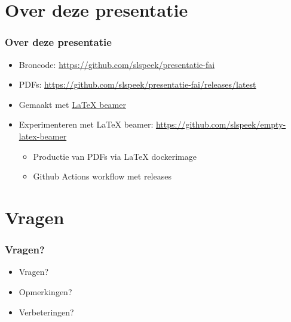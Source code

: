 \documentclass{beamer}
\begin{document}
\section{Over deze presentatie}

\begin{frame}
\frametitle{Over deze presentatie}
\begin{itemize}
  \item Broncode: \url{https://github.com/slspeek/presentatie-fai}
  \item PDFs: \url{https://github.com/slspeek/presentatie-fai/releases/latest}
  \item Gemaakt met \href{https://nl.mirrors.cicku.me/ctan/macros/latex/contrib/beamer/doc/beameruserguide.pdf}{\LaTeX{} beamer}
  \item Experimenteren met \LaTeX{} beamer: \url{https://github.com/slspeek/empty-latex-beamer}
  \begin{itemize}
    \item Productie van PDFs via \LaTeX{} dockerimage
    \item Github Actions workflow met releases
  \end{itemize}
\end{itemize}

\end{frame}

\section{Vragen}
\begin{frame}
\frametitle{Vragen?}
\begin{itemize}
  \item<2-> Vragen?
  \item<3-> Opmerkingen?
  \item<4-> Verbeteringen?
\end{itemize}
\end{frame}
\end{document}
